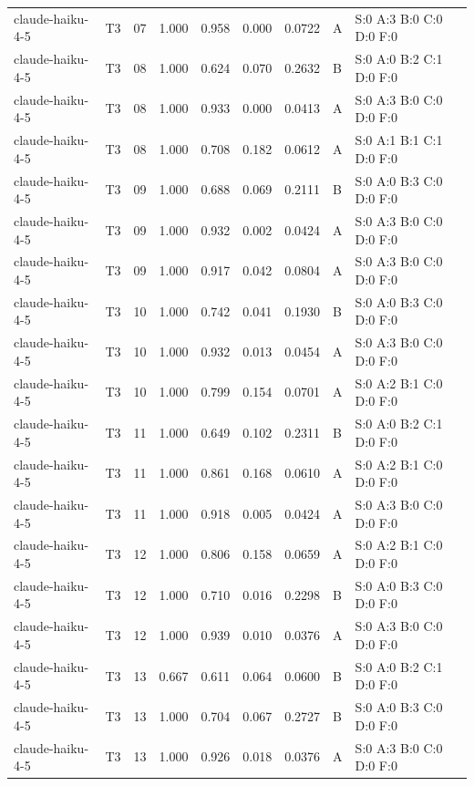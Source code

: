\begin{longtable}{llrrrrrll}
claude-haiku-4-5 & T3 & 07 & 1.000 & 0.958 & 0.000 & 0.0722 & A & \tiny S:0 A:3 B:0 C:0 D:0 F:0 \\
claude-haiku-4-5 & T3 & 08 & 1.000 & 0.624 & 0.070 & 0.2632 & B & \tiny S:0 A:0 B:2 C:1 D:0 F:0 \\
claude-haiku-4-5 & T3 & 08 & 1.000 & 0.933 & 0.000 & 0.0413 & A & \tiny S:0 A:3 B:0 C:0 D:0 F:0 \\
claude-haiku-4-5 & T3 & 08 & 1.000 & 0.708 & 0.182 & 0.0612 & A & \tiny S:0 A:1 B:1 C:1 D:0 F:0 \\
claude-haiku-4-5 & T3 & 09 & 1.000 & 0.688 & 0.069 & 0.2111 & B & \tiny S:0 A:0 B:3 C:0 D:0 F:0 \\
claude-haiku-4-5 & T3 & 09 & 1.000 & 0.932 & 0.002 & 0.0424 & A & \tiny S:0 A:3 B:0 C:0 D:0 F:0 \\
claude-haiku-4-5 & T3 & 09 & 1.000 & 0.917 & 0.042 & 0.0804 & A & \tiny S:0 A:3 B:0 C:0 D:0 F:0 \\
claude-haiku-4-5 & T3 & 10 & 1.000 & 0.742 & 0.041 & 0.1930 & B & \tiny S:0 A:0 B:3 C:0 D:0 F:0 \\
claude-haiku-4-5 & T3 & 10 & 1.000 & 0.932 & 0.013 & 0.0454 & A & \tiny S:0 A:3 B:0 C:0 D:0 F:0 \\
claude-haiku-4-5 & T3 & 10 & 1.000 & 0.799 & 0.154 & 0.0701 & A & \tiny S:0 A:2 B:1 C:0 D:0 F:0 \\
claude-haiku-4-5 & T3 & 11 & 1.000 & 0.649 & 0.102 & 0.2311 & B & \tiny S:0 A:0 B:2 C:1 D:0 F:0 \\
claude-haiku-4-5 & T3 & 11 & 1.000 & 0.861 & 0.168 & 0.0610 & A & \tiny S:0 A:2 B:1 C:0 D:0 F:0 \\
claude-haiku-4-5 & T3 & 11 & 1.000 & 0.918 & 0.005 & 0.0424 & A & \tiny S:0 A:3 B:0 C:0 D:0 F:0 \\
claude-haiku-4-5 & T3 & 12 & 1.000 & 0.806 & 0.158 & 0.0659 & A & \tiny S:0 A:2 B:1 C:0 D:0 F:0 \\
claude-haiku-4-5 & T3 & 12 & 1.000 & 0.710 & 0.016 & 0.2298 & B & \tiny S:0 A:0 B:3 C:0 D:0 F:0 \\
claude-haiku-4-5 & T3 & 12 & 1.000 & 0.939 & 0.010 & 0.0376 & A & \tiny S:0 A:3 B:0 C:0 D:0 F:0 \\
claude-haiku-4-5 & T3 & 13 & 0.667 & 0.611 & 0.064 & 0.0600 & B & \tiny S:0 A:0 B:2 C:1 D:0 F:0 \\
claude-haiku-4-5 & T3 & 13 & 1.000 & 0.704 & 0.067 & 0.2727 & B & \tiny S:0 A:0 B:3 C:0 D:0 F:0 \\
claude-haiku-4-5 & T3 & 13 & 1.000 & 0.926 & 0.018 & 0.0376 & A & \tiny S:0 A:3 B:0 C:0 D:0 F:0 \\

\end{longtable}

